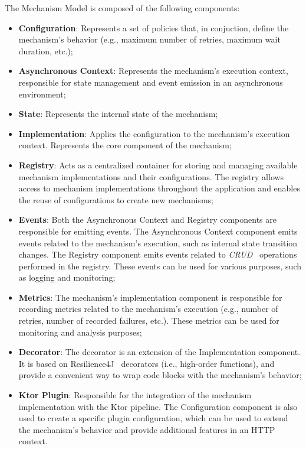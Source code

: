 The Mechanism Model is composed of the following components:
\begin{itemize}
    \item \textbf{Configuration}: Represents a set of policies that, in conjuction, define the mechanism's behavior (e.g., maximum number of retries, maximum wait duration, etc.);
    \item \textbf{Asynchronous Context}: Represents the mechanism's execution context, responsible for state management and event emission in an asynchronous environment;
    \item \textbf{State}: Represents the internal state of the mechanism;
    \item \textbf{Implementation}: Applies the configuration to the mechanism's execution context.
    Represents the core component of the mechanism;
    \item \textbf{Registry}: Acts as a centralized container for storing and managing available mechanism implementations and their configurations.
    The registry allows access to mechanism implementations throughout the application and enables the reuse of configurations to create new mechanisms;
    \item \textbf{Events}: Both the Asynchronous Context and Registry components are responsible for emitting events.
    The Asynchronous Context component emits events related to the mechanism's execution, such as internal state transition changes.
    The Registry component emits events related to \textit{CRUD}~\cite{wiki:crud-operations} operations performed in the registry.
    These events can be used for various purposes, such as logging and monitoring;
    \item \textbf{Metrics}: The mechanism's implementation component is responsible for recording metrics related to the mechanism's execution (e.g., number of retries, number of recorded failures, etc.).
    These metrics can be used for monitoring and analysis purposes;
    \item \textbf{Decorator}: The decorator is an extension of the Implementation component.
    It is based on Resilience4J~\cite{resilience4j} decorators (i.e., high-order functions), and provide a convenient way to wrap code blocks with the mechanism's behavior;
    \item \textbf{Ktor Plugin}: Responsible for the integration of the mechanism implementation with the Ktor pipeline.
    The Configuration component is also used to create a specific plugin configuration,
    which can be used to extend the mechanism's behavior and provide additional features in an HTTP context.
\end{itemize}

